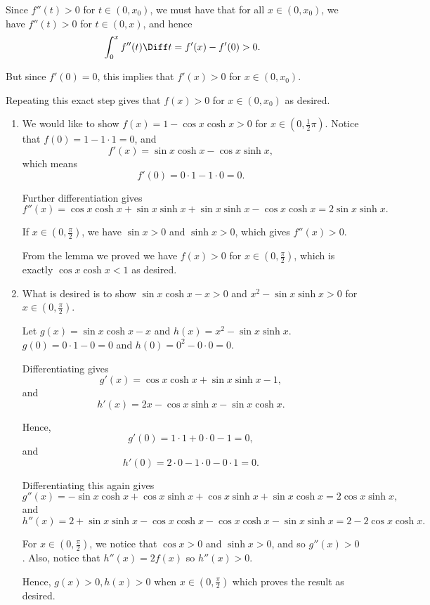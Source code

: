 \Question{\currfilebase}

Since \(f''(t) > 0\) for \(t \in (0, x_0)\), we must have that for all \(x \in (0, x_0)\), we have \(f''(t) > 0\) for \(t \in (0, x)\), and hence
\[
    \int_{0}^{x} f''(t) \Diff t = f'(x) - f'(0) > 0.
\]

But since \(f'(0) = 0\), this implies that \(f'(x) > 0\) for \(x \in (0, x_0)\).

Repeating this exact step gives that \(f(x) > 0\) for \(x \in (0, x_0)\) as desired.

\begin{enumerate}
    \item We would like to show \(f(x) = 1 - \cos x \cosh x > 0\) for \(x \in \left(0, \frac{1}{2}\pi\right)\). Notice that \(f(0) = 1 - 1 \cdot 1 = 0\), and
          \[
              f'(x) = \sin x \cosh x - \cos x \sinh x,
          \]
          which means
          \[
              f'(0) = 0 \cdot 1 - 1 \cdot 0 = 0.
          \]

          Further differentiation gives
          \[
              f''(x) = \cos x \cosh x + \sin x \sinh x + \sin x \sinh x - \cos x \cosh x = 2 \sin x \sinh x.
          \]

          If \(x \in \left(0, \frac{\pi}{2}\right)\), we have \(\sin x > 0\) and \(\sinh x > 0\), which gives \(f''(x) > 0\).

          From the lemma we proved we have \(f(x) > 0\) for \(x \in \left(0, \frac{\pi}{2}\right)\), which is exactly \(\cos x \cosh x < 1\) as desired.

    \item What is desired is to show \(\sin x \cosh x - x > 0\) and \(x^2 - \sin x \sinh x > 0\) for \(x \in \left(0, \frac{\pi}{2}\right)\).

          Let \(g(x) = \sin x \cosh x - x\) and \(h(x) = x^2 - \sin x \sinh x\). \(g(0) = 0 \cdot 1 - 0 = 0\) and \(h(0) = 0^2 - 0 \cdot 0 = 0\).

          Differentiating gives
          \[
              g'(x) = \cos x \cosh x + \sin x \sinh x - 1,
          \]
          and
          \[
              h'(x) = 2x - \cos x \sinh x - \sin x \cosh x.
          \]

          Hence,
          \[
              g'(0) = 1 \cdot 1 + 0 \cdot 0 - 1 = 0,
          \]
          and
          \[
              h'(0) = 2 \cdot 0 - 1 \cdot 0 - 0 \cdot 1 = 0.
          \]

          Differentiating this again gives
          \[
              g''(x) = - \sin x \cosh x + \cos x \sinh x + \cos x \sinh x + \sin x \cosh x = 2 \cos x \sinh x,
          \]
          and
          \[
              h''(x) = 2 + \sin x \sinh x - \cos x \cosh x - \cos x \cosh x - \sin x \sinh x = 2 - 2 \cos x \cosh x.
          \]

          For \(x \in (0, \frac{\pi}{2})\), we notice that \(\cos x > 0\) and \(\sinh x > 0\), and so \(g''(x) > 0\). Also, notice that \(h''(x) = 2 f(x)\) so \(h''(x) > 0\).

          Hence, \(g(x) > 0, h(x) > 0\) when \(x \in (0, \frac{\pi}{2})\) which proves the result as desired.
\end{enumerate}
